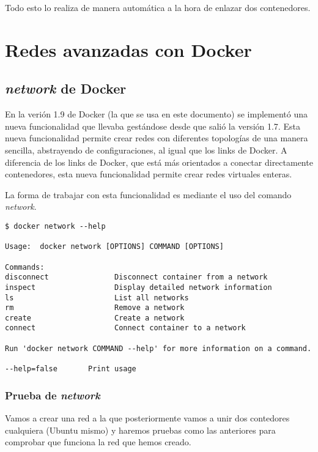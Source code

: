 		Todo esto lo realiza de manera automática a la hora de enlazar dos contenedores.
	
	\section{Redes avanzadas con Docker}
	
		\subsection{\textit{network} de Docker}
		En la verión 1.9 de Docker (la que se usa en este documento) se implementó una nueva funcionalidad que llevaba gestándose desde que salió la versión 1.7. Esta nueva funcionalidad permite crear redes con diferentes topologías de una manera sencilla, abstrayendo de configuraciones, al igual que los links de Docker. A diferencia de los links de Docker, que está más orientados a conectar directamente contenedores, esta nueva funcionalidad permite crear redes virtuales enteras.
		
		La forma de trabajar con esta funcionalidad es mediante el uso del comando \textit{\emph{network}}.
		
		\begin{lstlisting}[style=consola]
$ docker network --help

Usage:	docker network [OPTIONS] COMMAND [OPTIONS]

Commands:
disconnect               Disconnect container from a network
inspect                  Display detailed network information
ls                       List all networks
rm                       Remove a network
create                   Create a network
connect                  Connect container to a network

Run 'docker network COMMAND --help' for more information on a command.

--help=false       Print usage
		\end{lstlisting}
		
			\subsubsection{Prueba de \textit{network}}
			Vamos a crear una red a la que posteriormente vamos a unir dos contedores cualquiera (Ubuntu mismo) y haremos pruebas como las anteriores para comprobar que funciona la red que hemos creado.
			
